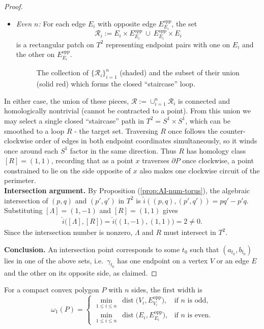 \begin{proof}
\begin{itemize}
\item \emph{Even $n$:} For each edge $E_i$ with opposite edge $E_{E_i}^{opp}$, the set
\[
\mathcal{R}_i := E_i\times E_{E_i}^{opp} \ \cup\ E_{E_i}^{opp}\times E_i
\]
is a rectangular patch on $T^2$ representing endpoint pairs with one on $E_i$ and the other on $E_{E_i}^{opp}$.
\begin{figure}[ht]
    \centering
    
    \caption{The collection of $\{\mathcal{R}_i\}_{i=1}^n$ (shaded) and the subset of their union (solid red) which forms the closed  “staircase” loop.}
\end{figure}
\FloatBarrier
\end{itemize}
In either case, the union of these pieces, $\mathcal{R}:=\cup_{i=1}^n\mathcal{R}_i$ is connected and homologically nontrivial (cannot be contracted to a point). From this union we may select a single closed “staircase” path in $T^2=S^1 \times S^1$, which can be smoothed to a loop $R$ - the target set. Traversing $R$ once follows the counter-clockwise order of edges in both endpoint coordinates simultaneously, so it winds once around each $S^1$ factor in the same direction. Thus $R$ has homology class $[R]=(1,1)$, recording that as a point $x$ traverses $\partial P$ once clockwise, a point constrained to lie on the side opposite of $x$ also makes one clockwise circuit of the perimeter. \\

\noindent \textbf{Intersection argument.}
By Proposition (\ref{prop:AI-num-torus}), the algebraic intersection of $(p,q)$ and $(p',q')$ in $T^2$ is \(\widehat{i}((p,q),(p',q')) = pq'-p'q\). Substituting $[\Lambda]=(1,-1)$ and $[R]=(1,1)$ gives
\begin{align*}
\widehat{i}\big([\Lambda],[R]\big)=\widehat{i}\big((1,-1),(1,1)\big)=2\neq0.
\end{align*}
Since the intersection number is nonzero, $\Lambda$ and $R$ must intersect in $T^2$.

\noindent\textbf{Conclusion.}
An intersection point corresponds to some $t_0$ such that $(a_{t_0},b_{t_0})$ lies in one of the above sets, i.e.\ $\gamma_{t_0}$ has one endpoint on a vertex $V$ or an edge $E$ and the other on its opposite side, as claimed.
\end{proof}



\begin{theorem}\label{thm:first-width-convex-polygon}
For a compact convex polygon $P$ with $n$ sides, the first width is
\begin{equation}\label{eq:first-width-convex-polygons}
    \omega_1(P) = 
    \begin{cases}
        \displaystyle \min_{1\le i\le n}\ \operatorname{dist}\!\big(V_i,E_{V_i}^{\mathrm{opp}}\big), & \text{if $n$ is odd},\\
        \displaystyle \min_{1\le i\le n}\ \operatorname{dist}\!\big(E_i,E_{E_i}^{\mathrm{opp}}\big), & \text{if $n$ is even}.
    \end{cases}
\end{equation}
\end{theorem}

